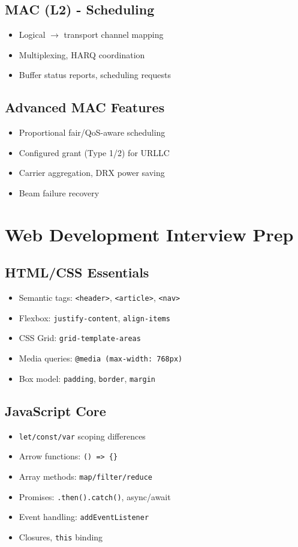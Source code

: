 \documentclass[12pt,a4paper]{article}
\begin{document}
\subsection{MAC (L2) - Scheduling}
\begin{itemize}
  \item Logical $\rightarrow$ transport channel mapping
  \item Multiplexing, HARQ coordination
  \item Buffer status reports, scheduling requests
\end{itemize}

\subsection{Advanced MAC Features}
\begin{itemize}
  \item Proportional fair/QoS-aware scheduling
  \item Configured grant (Type 1/2) for URLLC
  \item Carrier aggregation, DRX power saving
  \item Beam failure recovery
\end{itemize}

\section{Web Development Interview Prep}

\subsection{HTML/CSS Essentials}
\begin{itemize}
  \item Semantic tags: \texttt{<header>}, \texttt{<article>}, \texttt{<nav>}
  \item Flexbox: \texttt{justify-content}, \texttt{align-items}
  \item CSS Grid: \texttt{grid-template-areas}
  \item Media queries: \texttt{@media (max-width: 768px)}
  \item Box model: \texttt{padding}, \texttt{border}, \texttt{margin}
\end{itemize}

\subsection{JavaScript Core}
\begin{itemize}
  \item \texttt{let/const/var} scoping differences
  \item Arrow functions: \texttt{() => \{\}}
  \item Array methods: \texttt{map/filter/reduce}
  \item Promises: \texttt{.then().catch()}, async/await
  \item Event handling: \texttt{addEventListener}
  \item Closures, \texttt{this} binding
\end{itemize}
\end{document}
